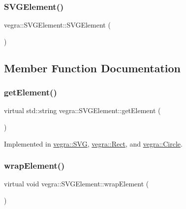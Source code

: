 \subsubsection{\texorpdfstring{S\+V\+G\+Element()}{SVGElement()}}
{\footnotesize\ttfamily vegra\+::\+S\+V\+G\+Element\+::\+S\+V\+G\+Element (\begin{DoxyParamCaption}{ }\end{DoxyParamCaption})\hspace{0.3cm}{\ttfamily [inline]}}



\subsection{Member Function Documentation}
\mbox{\label{structvegra_1_1SVGElement_a17fa30b9de97e1541eaa1f6888145de2}} 
\subsubsection{\texorpdfstring{get\+Element()}{getElement()}}
{\footnotesize\ttfamily virtual std\+::string vegra\+::\+S\+V\+G\+Element\+::get\+Element (\begin{DoxyParamCaption}{ }\end{DoxyParamCaption})\hspace{0.3cm}{\ttfamily [pure virtual]}}



Implemented in \mbox{\hyperlink{structvegra_1_1SVG_aec9681b5ca49e9cdd48297677b18151b}{vegra\+::\+S\+VG}}, \mbox{\hyperlink{structvegra_1_1Rect_a914ba572d7bda0dcb40b6f112d959f04}{vegra\+::\+Rect}}, and \mbox{\hyperlink{structvegra_1_1Circle_a50bdbe7e4b29530b131e7a1157190b00}{vegra\+::\+Circle}}.

\mbox{\label{structvegra_1_1SVGElement_a1369400ebe57287f1b5beb5f0234d8d7}} 
\subsubsection{\texorpdfstring{wrap\+Element()}{wrapElement()}}
{\footnotesize\ttfamily virtual void vegra\+::\+S\+V\+G\+Element\+::wrap\+Element (\begin{DoxyParamCaption}{ }\end{DoxyParamCaption})\hspace{0.3cm}{\ttfamily [pure virtual]}}



